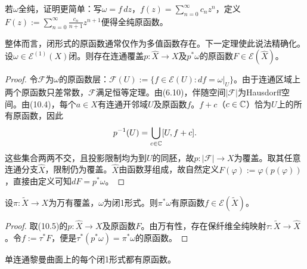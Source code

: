 若$\omega$全纯，证明更简单：写$\omega=f\,dz$，$f(z)=\sum_{n=0}^\infty c_nz^n$，定义$F(z):=\sum_{n=0}^\infty\frac{c_n}{n+1}z^{n+1}$便得全纯原函数。

整体而言，闭形式的原函数通常仅作为多值函数存在。下一定理使此说法精确化。
设$\omega\in\mathcal E^{(1)}(X)$闭。则存在连通覆盖$p:\widehat X\to X$及$p^*\omega$的原函数$F\in\mathcal E(\widehat X)$。
\begin{proof}
令$\mathcal F$为$\omega$的原函数层：$\mathcal F(U):=\{f\in\mathcal E(U):df=\omega|_U\}$。由于连通区域上两个原函数只差常数，$\mathcal F$满足恒等定理。由(6.10)，伴随空间$|\mathcal F|$为Hausdorff空间。由(10.4)，每个$a\in X$有连通开邻域$U$及原函数$f$。$f+c$（$c\in\mathbb C$）恰为$U$上的所有原函数，因此
\[
p^{-1}(U)=\bigcup_{c\in\mathbb C}[U,f+c].
\]
这些集合两两不交，且投影限制均为到$U$的同胚，故$p:|\mathcal F|\to X$为覆盖。取其任意连通分支$\widehat X$，限制仍为覆盖。$\widehat X$由函数芽组成，故自然定义$F(\varphi):=\varphi(p(\varphi))$，直接由定义可知$dF=p^*\omega$。
\end{proof}
设$\pi:\widetilde X\to X$为万有覆盖，$\omega$为闭1形式。则$\pi^*\omega$有原函数$f\in\mathcal E(\widetilde X)$。
\begin{proof}
取(10.5)的$p:\widehat X\to X$及原函数$F$。由万有性，存在保纤维全纯映射$\tau:\widetilde X\to\widehat X$。令$f:=\tau^*F$，便是$\tau^*(p^*\omega)=\pi^*\omega$的原函数。
\end{proof}
单连通黎曼曲面上的每个闭1形式都有原函数。

